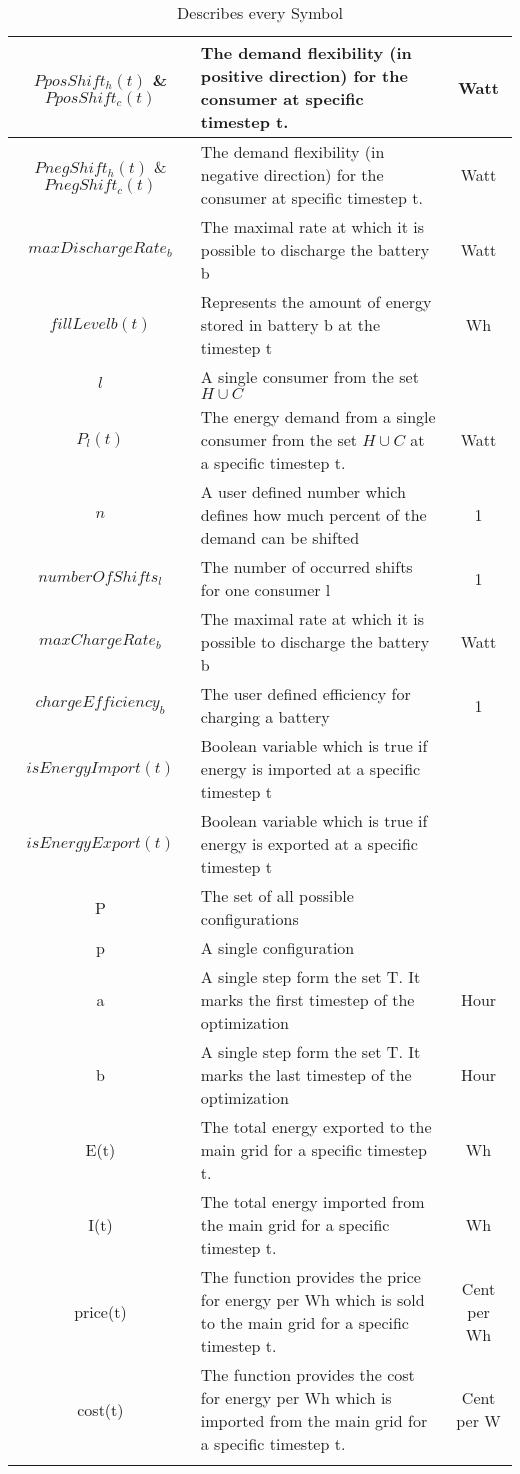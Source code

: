 \begin{longtable}{|c|p{}|c|}
		$PposShift_{h}(t)$ \& $PposShift_{c}(t)$ & The demand flexibility (in positive direction) for the consumer at specific timestep t. & Watt \\ \midrule
		$PnegShift_{h}(t)$ \& $PnegShift_{c}(t)$ & The demand flexibility (in negative direction) for the consumer at specific timestep t. & Watt \\ \midrule
		$maxDischargeRate_{b}$ & The maximal rate at which it is possible to discharge the battery b & Watt \\ \midrule
		$fillLevel{b}(t)$ & Represents the amount of energy stored in battery b at the timestep t & Wh \\ \midrule
		$l$ & A single consumer from the set $H\cup C$ & \\ \midrule
		$P_{l}(t)$ & The energy demand from a single consumer from the set $H\cup C$ at a specific timestep t. & Watt \\ \midrule
		$n$ & A user defined number which defines how much percent of the demand can be shifted & 1 \\ \midrule
		$numberOfShifts_{l}$ & The number of occurred shifts for one consumer l & 1 \\ \midrule
		$maxChargeRate_{b}$ & The maximal rate at which it is possible to discharge the battery b & Watt \\ \midrule
		$chargeEfficiency_{b}$ & The user defined efficiency for charging a battery & 1 \\ \midrule
		$isEnergyImport(t)$ & Boolean variable which is true if energy is imported  at a specific timestep t&  \\ \midrule
		$isEnergyExport(t)$ & Boolean variable which is true if energy is exported  at a specific timestep t&  \\ \midrule
		P & The set of all possible configurations &  \\ \midrule
		p & A single configuration &  \\ \midrule
		a & A single step form the set T. It marks the first timestep of the optimization & Hour \\ \midrule
		b & A single step form the set T. It marks the last timestep of the optimization & Hour \\ \midrule
		E(t) & The total energy exported to the main grid for a specific timestep t. & Wh \\ \midrule
		I(t) & The total energy imported from the main grid for a specific timestep t. & Wh  \\ \midrule
		price(t) & The function provides the price for energy per Wh which is sold to the main grid for a specific timestep t. & Cent per Wh \\ \midrule
		cost(t) & The function provides the cost for energy per Wh which is imported from the main grid for a specific timestep t. & Cent per W \\
		\bottomrule
			\caption[Nomenclature Table]{Describes every Symbol}
		\label{tab:Ergebnisse}
	\end{longtable}


